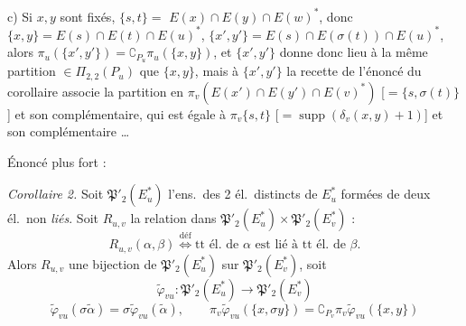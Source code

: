 \documentclass[11pt,a4paper]{article}
\begin{document}
c) Si $x, y$ sont fixés,   
$\lbrace s, t \rbrace =$   $E(x) \cap E(y) \cap E(w)^{*}$, donc \ill{} $\lbrace x, y \rbrace = E(s)
\cap E(t) \cap E(u)^{*}$,   $\lbrace x', y' \rbrace =
E(s) \cap E(\sigma(t)) \cap E(u)^{*}$, alors $\pi_u(\lbrace x', y' \rbrace) =
\complement_{P_u} \pi_u(\lbrace x, y \rbrace)$,  et
$\lbrace x', y' \rbrace$ donne donc lieu à la même partition $\in
\Pi_{2,2}(P_u)$ que $\lbrace x, y \rbrace$, mais à $\lbrace x', y' \rbrace$ la
recette  de l'énoncé du corollaire associe la partition en
$\pi_v(E(x') \cap E(y') \cap E(v)^{*})$ [$= \lbrace s, \sigma(t) \rbrace$] et
son complémentaire, qui \struck{\ill{}} est égale à $\pi_v\lbrace s, t \rbrace$
[$= \operatorname{supp}(\delta_v(x, y) + 1)$] et son complémentaire \ldots

Énoncé plus fort :

\emph{Corollaire 2.} Soit $\mathfrak{P}'_2(E_u^{*})$ l'ens.\ des
  2 él.\ distincts de $E_u^{*}$ formées de deux
él.\ non \emph{liés}.
Soit $R_{u,v}$ la relation \struck{\ill{}} dans $\mathfrak{P}'_2(E_u^{*})
\times \mathfrak{P}'_2(E_v^{*})$ :
\[
R_{u,v}(\alpha, \beta) \overset{\text{déf}}{\iff} \text{tt él.\ de } \alpha
\text{ est lié à tt él.\ de } \beta .
\]
Alors $R_{u,v}$  une bijection de
$\mathfrak{P}'_2(E_u^{*})$ sur $\mathfrak{P}'_2(E_v^{*})$, soit
\struck{$\varphi$}
\[
\tilde{\varphi}_{vu} : \mathfrak{P}'_2(E_u^{*}) \to \mathfrak{P}'_2(E_v^{*})
\]
\[
\tilde{\varphi}_{vu}(\sigma \tilde{\alpha}) = \sigma
\tilde{\varphi}_{vu}(\tilde{\alpha}), \qquad \pi_v \tilde{\varphi}_{vu}(\lbrace x,
\sigma y \rbrace) = \complement_{P_v} \pi_v \tilde{\varphi}_{vu}(\lbrace x, y
\rbrace)
\]

\end{document}
